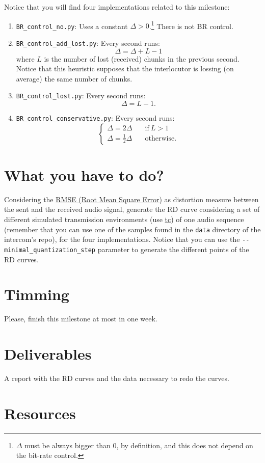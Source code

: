 Notice that you will find four implementations related to this milestone:
\begin{enumerate}
\item \verb|BR_control_no.py|: Uses a constant
  $\Delta>0$.\footnote{$\Delta$ must be always bigger than $0$, by
definition, and this does not depend on the bit-rate control.} There
  is not BR control.
\item \verb|BR_control_add_lost.py|: Every second runs:
  \begin{equation}
    \Delta = \Delta + L - 1
  \end{equation}
  where $L$ is the number of lost (received) chunks in the previous
  second. Notice that this heuristic supposes that the interlocutor is
  lossing (on average) the same number of chunks.
\item \verb|BR_control_lost.py|: Every second runs:
  \begin{equation}
    \Delta = L - 1.
  \end{equation}
\item \verb|BR_control_conservative.py|: Every second runs:
  \begin{equation}
    \left\{
    \begin{array}{ll}
      \Delta = 2\Delta & \quad\text{if}~L>1 \\
      \Delta = \frac{1}{2}\Delta & \quad\text{otherwise}.
    \end{array}
    \right.
  \end{equation}
\end{enumerate}

\section{What you have to do?}

Considering the
\href{https://en.wikipedia.org/wiki/Root-mean-square_deviation}{RMSE
  (Root Mean Square Error)} as distortion measure between the sent and
the received audio signal, generate the RD curve considering a set of
different simulated transmission environments (use
\href{https://man7.org/linux/man-pages/man8/tc.8.html}{tc}) of one
audio sequence (remember that you can use one of the samples found in
the \verb|data| directory of the intercom's repo), for the four
implementations. Notice that you can use the
\verb|--minimal_quantization_step| parameter to generate the different
points of the RD curves.

\section{Timming}

Please, finish this milestone at most in one week.

\section{Deliverables}

A report with the RD curves and the data necessary to redo the curves.

\section{Resources}


